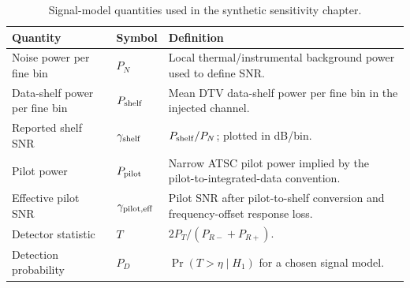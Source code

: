 \begin{table}[ht]
\centering
\caption{Signal-model quantities used in the synthetic sensitivity chapter.}
\label{tab:signal-model-quantities}
\begin{tabularx}{\textwidth}{l l Y}
\toprule
Quantity & Symbol & Definition \\
\midrule
Noise power per fine bin & $P_N$ & Local thermal/instrumental background power used to define SNR. \\
Data-shelf power per fine bin & $P_{\rm shelf}$ & Mean DTV data-shelf power per fine bin in the injected channel. \\
Reported shelf SNR & $\gamma_{\rm shelf}$ & $P_{\rm shelf}/P_N$; plotted in dB/bin. \\
Pilot power & $P_{\rm pilot}$ & Narrow ATSC pilot power implied by the pilot-to-integrated-data convention. \\
Effective pilot SNR & $\gamma_{\rm pilot,eff}$ & Pilot SNR after pilot-to-shelf conversion and frequency-offset response loss. \\
Detector statistic & $T$ & $2P_T/(P_{R-}+P_{R+})$. \\
Detection probability & $P_D$ & $\Pr(T>\eta\mid H_1)$ for a chosen signal model. \\
\bottomrule
\end{tabularx}
\end{table}